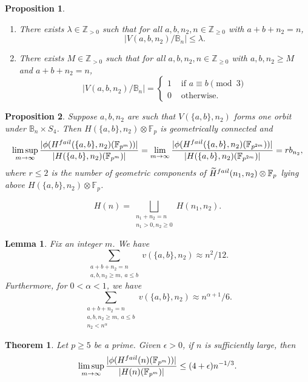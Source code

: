 \documentclass[10pt,a4paper]{amsart}
\newtheorem{proposition}{Proposition}
\newtheorem{lemma}{Lemma}
\newtheorem{theorem}{Theorem}
\newcommand\FF{\mathbb{F}}
\newcommand\ZZ{\mathbb{Z}}
\begin{document}
\begin{proposition}\label{prop:cpa4}
  \begin{enumerate}
  \item There exists $\lambda\in\mathbb{Z}_{>0}$ such that for all \(a,b,n_2,n \in \ZZ_{\geq 0}\) with $a+b+n_2=n$, 
    \[ |V(a,b,n_2)/{\mathbb{B}_n}| \leq \lambda.\]
   \item There exists $M\in\mathbb{Z}_{>0}$ such that for all \(a,b,n_2, n \in \ZZ_{\geq 0}\) with \(a,b,n_2 \geq M\) and $a+b+n_2=n$,
    \[ |V(a,b,n_2)/{\mathbb{B}_n}| = \begin{cases} 1 & \text{ if } a \equiv b \pmod 3 \\
    0 &\text{ otherwise.}
  \end{cases}\]
  \end{enumerate}
\end{proposition}

\begin{proposition}\label{prop:precise-q}
  Suppose \(a,b,n_2\) are such that \(V(\{a,b\},n_2)\) forms one orbit under \({\mathbb{B}_n} \times S_4\).
  Then \(H(\{a,b\}, n_2) \otimes \FF_p\) is geometrically connected and
  \[ \limsup_{m \to \infty} \frac{|\phi(H^{\rm fail}(\{a,b\},n_2)(\FF_{p^m}))|}{|H(\{a,b\},n_2)(\FF_{p^m})|} =\lim_{m \to \infty} \frac{|\phi(H^{\rm fail}(\{a,b\},n_2)(\FF_{p^{2m}}))|}{|H(\{a,b\},n_2)(\FF_{p^{2m}})|}= r b_{n_2},\]
   where $r\leq 2$ is the number of geometric components of \(\widetilde H^{\rm fail}(n_1,n_2) \otimes \FF_p\) lying above \(H(\{a,b\}, n_2) \otimes \FF_p\). 
\end{proposition}

\begin{equation}\label{eq:disjoint}
    H(n) =  \bigsqcup_{\substack{n_1+n_2 = n \\ n_1 > 0, n_2 \geq 0}} H(n_1,n_2).
\end{equation} 

\begin{lemma}\label{lem:estimates}
  Fix an integer \(m\).
  We have
  \[ \sum_{\substack{a+b+n_2 = n\\ a,b,n_2 \geq m,\ a \leq b}}v(\{a,b\},n_2) \approx n^2/12.\]
  Furthermore, for \(0 < \alpha < 1\), we have
  \[ \sum_{\substack{a+b+n_2 = n\\a,b,n_2 \geq m,\ a \leq b\\n_2 < n^{\alpha}}} v(\{a,b\},n_2) \approx n^{\alpha+1}/6.\]
\end{lemma}

\begin{theorem}\label{thm: failbound general n}
  Let \(p \geq 5\) be a prime.
    Given \(\epsilon > 0\), if \(n\) is sufficiently large, then 
  \[ \limsup_{m \to \infty} \frac{|\phi(H^{\rm fail}(n)(\FF_{p^m}))|}{|H(n)(\FF_{p^m})|} \leq (4+\epsilon) n^{-1/3}.\]
\end{theorem}
\end{document}
